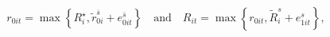 \begin{equation}\label{equation10}
	 r_{0it}=\max\left\{R_i^\star,\widetilde r_{0i}^{\overline s}+e_{0it}^{\overline s}\right\}\quad\text{and}\quad R_{it} = \max\left\{r_{0it},\widetilde R_i^s+e_{1it}^s\right\},
\end{equation}
